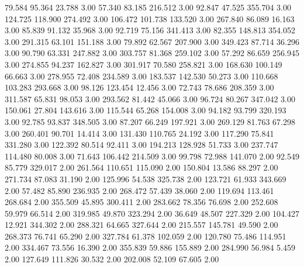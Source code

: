   79.584   95.364   23.788         3.00
  57.340   83.185  216.512         3.00
  92.847   47.525  355.704         3.00
 124.725  118.900  274.492         3.00
 106.472  101.738  133.520         3.00
 267.840   86.089   16.163         3.00
  85.839   91.132   35.968         3.00
  92.719   75.156  341.413         3.00
  82.355  148.813  354.052         3.00
 291.315   63.101  151.188         3.00
  79.892   62.567  207.900         3.00
 349.423   87.714   36.296         3.00
  90.790   63.331  247.882         3.00
 303.757   81.368  259.102         3.00
  57.292   86.659  256.945         3.00
 274.855   94.237  162.827         3.00
 301.917   70.580  258.821         3.00
 168.630  100.149   66.663         3.00
 278.955   72.408  234.589         3.00
 183.537  142.530   50.273         3.00
 110.668  103.283  293.668         3.00
  98.126  123.454   12.456         3.00
  72.743   78.686  208.359         3.00
 311.587   65.831   98.053         3.00
 293.562   81.442   45.066         3.00
  96.724   80.267  347.042         3.00
 150.061   27.804  143.616         3.00
 115.544   65.268  154.008         3.00
  94.182   93.799  320.193         3.00
  92.785   93.837  348.505         3.00
  87.207   66.249  197.921         3.00
 269.129   81.763   67.298         3.00
 260.401   90.701   14.414         3.00
 131.430  110.765   24.192         3.00
 117.290   75.841  331.280         3.00
 122.392   80.514   92.411         3.00
 194.213  128.928   51.733         3.00
 237.747  114.480   80.008         3.00
  71.643  106.442  214.509         3.00
  99.798   72.988  141.070         2.00
  92.549   85.779  329.017         2.00
 261.564  110.651  115.090         2.00
 150.804   13.586   88.297         2.00
 271.734   87.083   31.190         2.00
 125.996   54.538  325.738         2.00
 123.721   61.933  343.669         2.00
  57.482   85.890  236.935         2.00
 268.472   57.439   38.060         2.00
 119.694  113.461  268.684         2.00
 355.509   45.895  300.411         2.00
 283.662   78.356   76.698         2.00
 252.608   59.979   66.514         2.00
 319.985   49.870  323.294         2.00
  36.649   48.507  227.329         2.00
 104.427   12.921  344.302         2.00
 288.321   64.665  327.644         2.00
 215.557  145.781   49.590         2.00
 268.373   76.741   65.290         2.00
 327.784   61.378  102.059         2.00
 120.780   75.486  114.951         2.00
 334.467   73.556   16.390         2.00
 355.839   59.886  155.889         2.00
 284.990   56.984    5.459         2.00
 127.649  111.826   30.532         2.00
 202.008   52.109   67.605         2.00
